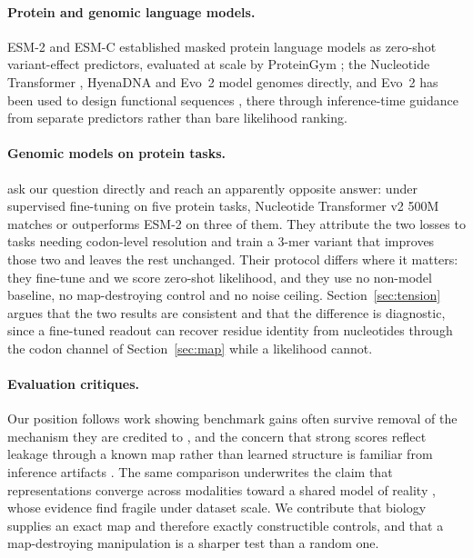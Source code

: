 \documentclass[11pt]{article}
\begin{document}
\paragraph{Protein and genomic language models.} ESM-2 \citep{lin2023esm2} and
ESM-C established masked protein language models as zero-shot variant-effect
predictors, evaluated at scale by ProteinGym \citep{notin2023proteingym}; the
Nucleotide Transformer \citep{dalla2024nucleotide}, HyenaDNA
\citep{nguyen2023hyenadna} and Evo~2 \citep{brixi2025evo2} model genomes directly,
and Evo~2 has been used to design functional sequences
\citep{merchant2025evo,king2026phage}, there through inference-time guidance from
separate predictors rather than bare likelihood ranking.

\paragraph{Genomic models on protein tasks.} \citet{boshar2024glm} ask our question
directly and reach an apparently opposite answer: under supervised fine-tuning on
five protein tasks, Nucleotide Transformer v2 500M matches or outperforms ESM-2 on
three of them. They attribute the two losses to tasks needing codon-level
resolution and train a 3-mer variant that improves those two and leaves the rest
unchanged. Their protocol differs where it matters: they fine-tune and we score
zero-shot likelihood, and they use no non-model baseline, no map-destroying
control and no noise ceiling. Section~\ref{sec:tension}
argues that the two results are consistent and that the difference is diagnostic,
since a fine-tuned readout can recover residue identity from nucleotides through the
codon channel of Section~\ref{sec:map} while a likelihood cannot.

\paragraph{Evaluation critiques.} Our position follows work showing benchmark
gains often survive removal of the mechanism they are credited to
\citep{rendle2019difficulty,musgrave2020metric}, and the concern that strong scores
reflect leakage through a known map rather than learned structure is familiar from
inference artifacts \citep{gururangan2018annotation}. The same comparison underwrites the claim that
representations converge across modalities toward a shared model of reality
\citep{huh2024platonic}, whose evidence \citet{koepke2026cave} find fragile under
dataset scale. We contribute that biology supplies an exact map and therefore
exactly constructible controls, and that a map-destroying manipulation is a
sharper test than a random one.
\end{document}
